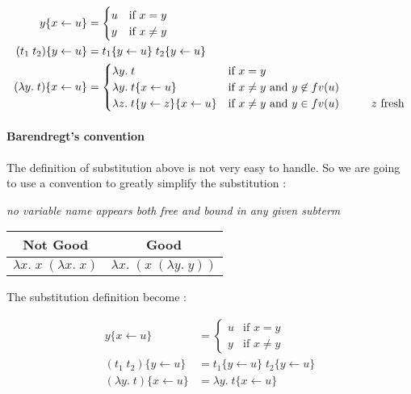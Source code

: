   \begin{align*}
    y\{x \leftarrow u\} &= \begin{cases}
      u & \text{if } x = y \\
      y & \text{if } x \not = y
    \end{cases} \\
    (t_1\; t_2)\{y \leftarrow u\} &= t_1\{y \leftarrow u\}\; t_2\{y \leftarrow
    u\} \\
    (\lambda y.\;t)\{x \leftarrow u\} &= \begin{cases}
      \lambda y.\;t &\text{if } x = y \\
      \lambda y.\;t\{x\leftarrow u\} &\text{if } x \not = y \text{ and } y \not
      \in fv(u)\\
      \lambda z.\;t\{y\leftarrow z\}\{x\leftarrow u\} &\text{if } x \not = y \text{ and } y \in
      fv(u) \text{\hspace{1cm}$z$ fresh}\\
    \end{cases}
  \end{align*}

  \paragraph{Barendregt's convention} The definition of substitution above is
  not very easy to handle. So we are going to use a convention to greatly
  simplify the substitution :

  \begin{center}
    \textit{no variable name appears both free and bound in any given subterm}
  \end{center}

  \begin{center}
    \begin{tabular}{c|c}
      Not Good & Good \\
      \hline
      $\lambda x.\;x\;(\lambda x.\;x)$ & $\lambda x.\;(x\;(\lambda y.\;y))$
    \end{tabular}
  \end{center}

  The substitution definition become :

  \begin{align*}
    y\{x \leftarrow u\} &= \begin{cases}
      u & \text{if } x = y \\
      y & \text{if } x \not = y
    \end{cases} \\
    (t_1\; t_2)\{y \leftarrow u\} &= t_1\{y \leftarrow u\}\; t_2\{y \leftarrow
    u\} \\
    (\lambda y.\;t)\{x \leftarrow u\} &= \lambda y.\; t\{x \leftarrow u\}
  \end{align*}

